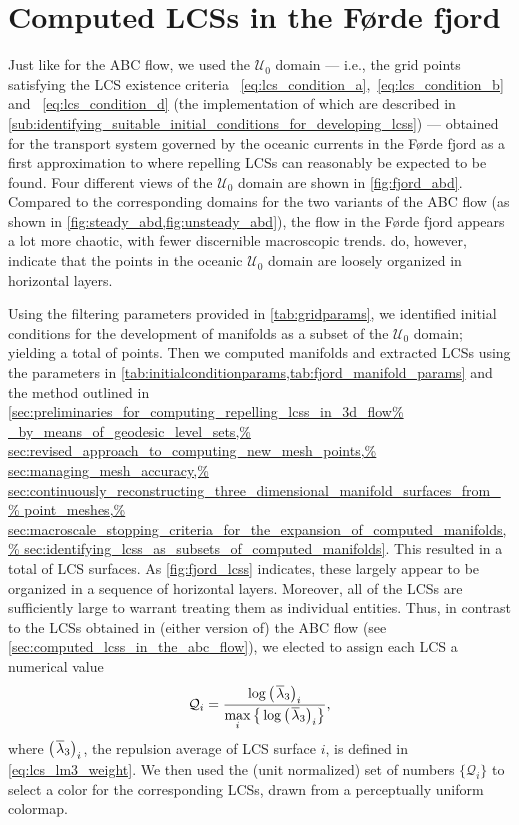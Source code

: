 \section{Computed LCSs in the Førde fjord}
\label{sec:computed_lcss_in_the_forde_fjord}

Just like for the ABC flow, we used the $\mathcal{U}_{0}$ domain --- i.e.,
the grid points satisfying the LCS existence criteria~
\eqref{eq:lcs_condition_a},~\eqref{eq:lcs_condition_b} and~
\eqref{eq:lcs_condition_d} (the implementation of which are described in
\cref{sub:identifying_suitable_initial_conditions_for_developing_lcss}) ---
obtained for the transport system governed by the oceanic currents in the
Førde fjord as a first approximation to where repelling LCSs can reasonably
be expected to be found. Four different views of the $\mathcal{U}_{0}$ domain
are shown in \cref{fig:fjord_abd}. Compared to the corresponding domains
for the two variants of the ABC flow (as shown in
\cref{fig:steady_abd,fig:unsteady_abd}), the flow in the Førde fjord appears
a lot more chaotic, with fewer discernible macroscopic trends.
 do, however, indicate that the
points in the oceanic $\mathcal{U}_{0}$ domain are loosely organized
in horizontal layers.



Using the filtering parameters provided in \cref{tab:gridparams}, we identified
initial conditions for the development of manifolds as a subset of the
$\mathcal{U}_{0}$ domain; yielding a total of  points.
Then we computed manifolds and extracted LCSs using the parameters
in \cref{tab:initialconditionparams,tab:fjord_manifold_params} and the method
outlined in \cref{sec:preliminaries_for_computing_repelling_lcss_in_3d_flow%
    _by_means_of_geodesic_level_sets,%
    sec:revised_approach_to_computing_new_mesh_points,%
    sec:managing_mesh_accuracy,%
    sec:continuously_reconstructing_three_dimensional_manifold_surfaces_from_%
    point_meshes,%
    sec:macroscale_stopping_criteria_for_the_expansion_of_computed_manifolds,%
    sec:identifying_lcss_as_subsets_of_computed_manifolds}. This resulted in
a total of  LCS surfaces. As \cref{fig:fjord_lcss} indicates,
these largely appear to be organized in a sequence of horizontal layers.
Moreover, all of the LCSs are sufficiently large to warrant treating them
as individual entities. Thus, in contrast to the LCSs obtained in (either
version of) the ABC flow (see \cref{sec:computed_lcss_in_the_abc_flow}), we
elected to assign each LCS a numerical value
\begin{equation}
    \label{eq:fjord_lcs_colorscaling}
    \mathcal{Q}_{i} = %
    \frac{\log{{\big({\mkern2mu}\overline{\lambda}_{3}\big)}_{i}}}%
    {\max\limits_{i}%
    \big\{\log{{\big({\mkern2mu}\overline{\lambda}_{3}\big)}_{i}}\big\}},
\end{equation}
where ${\big({\mkern2mu}\overline{\lambda}_{3}}\big)_{i}$, the repulsion
average of LCS surface $i$, is defined in \cref{eq:lcs_lm3_weight}. We then
used the (unit normalized) set of numbers $\big\{\mathcal{Q}_{i}\big\}$ to
select a color for the corresponding LCSs, drawn from a perceptually uniform
colormap.

